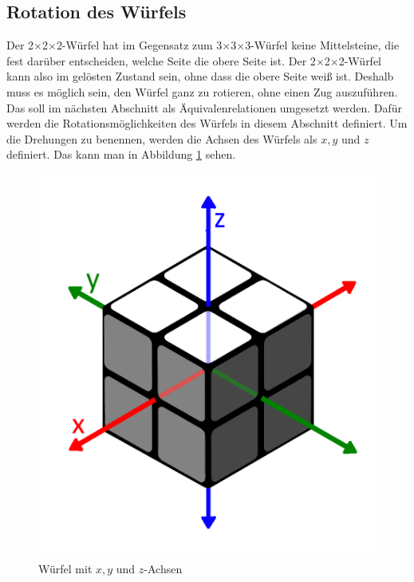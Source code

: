 \documentclass[12pt,a4paper, usenames, dvipsnames]{article}
\newcommand{\Ttwo}{2$\times$2$\times$2-}
\newcommand{\Tthree}{3$\times$3$\times$3-}
\begin{document}
%
%
%
%
%
%
%
%
%
%
%
%
\subsection*{Rotation des Würfels}

Der \Ttwo Würfel hat im Gegensatz zum \Tthree Würfel keine Mittelsteine, die fest darüber entscheiden, welche Seite die obere Seite ist. 
Der \Ttwo Würfel kann also im gelösten Zustand sein, ohne dass die obere Seite weiß ist. Deshalb muss es möglich sein, den Würfel ganz zu rotieren, ohne einen Zug auszuführen.
Das soll im nächsten Abschnitt als Äquivalenrelationen umgesetzt werden. Dafür werden die Rotationsmöglichkeiten des Würfels in diesem Abschnitt definiert.
Um die Drehungen zu benennen, werden die Achsen des Würfels als $x, y$ und $z$ definiert. Das kann man in Abbildung \ref{15} sehen.
\begin{figure}[h]
\centering
\includegraphics[scale=0.13]{Pfeile.png}
\caption[Würfel mit $x, y$ und $z$-Achsen]{Würfel mit $x, y$ und $z$-Achsen}
\label{15}
\end{figure} 
\end{document}
